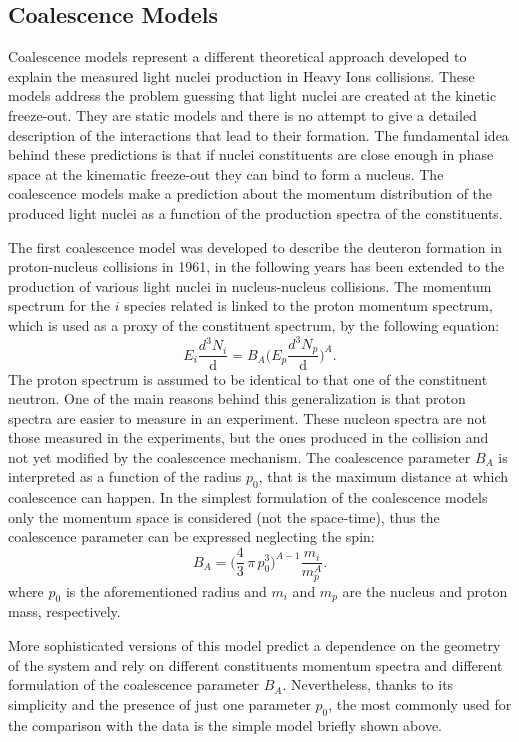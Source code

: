%
\subsection{Coalescence Models} \label{sec:1.4.2}

Coalescence models \cite{deuprod} represent a different theoretical approach developed to explain 
the measured light nuclei production in Heavy Ions collisions. 
These models address the problem guessing that light nuclei are created at the kinetic freeze-out. 
They are static models and there is no attempt to give a detailed description of the 
interactions that lead to their formation.
The fundamental idea behind these predictions is that if nuclei constituents are close enough in 
phase space at the kinematic freeze-out they can bind to form a nucleus. 
The coalescence models make a prediction about the momentum distribution of the produced light 
nuclei as a function of the production spectra of the constituents.

The first coalescence model was developed to describe the deuteron formation in
proton-nucleus collisions in 1961, in the following years has been extended to 
the production of various light nuclei in nucleus-nucleus collisions.
The momentum spectrum for the $i$ species related is linked to the proton momentum spectrum,
which is used as a proxy of the constituent spectrum, by the following equation:
\begin{equation}
    E_{i} \frac{d^{3}N_{i}}{\mathop{dp_{i}^{3}}} = B_{A} \Big( E_{p} \frac{d^{3}N_{p}}{\mathop{dp_{p}^{3}}} \Big)^{A}.
\end{equation}
The proton spectrum is assumed to be identical to that one of the constituent neutron.
One of the main reasons behind this generalization is that proton spectra are easier to measure
in an experiment.
These nucleon spectra are not those measured in the experiments, but the ones produced in the 
collision and not yet modified by the coalescence mechanism.
The coalescence parameter $B_{A}$ is interpreted as a function of the radius $p_{0}$, that 
is the maximum distance at which coalescence can happen.
In the simplest formulation of the coalescence models only the momentum space is considered
(not the space-time), thus the coalescence parameter can be expressed neglecting the spin:
\begin{equation} 
    B_{A} = \Big( \frac{4}{3}\, \pi \,p_{0}^3 \Big)^{A-1} \frac{m_{i}}{m_{p}^{A}}.
\end{equation}
where $p_{0}$ is the aforementioned radius and $m_{i}$ and $m_{p}$ are the nucleus and proton
mass, respectively.

More sophisticated versions of this model predict a dependence on the geometry of the system
and rely on different constituents momentum spectra and different formulation of 
the coalescence parameter $B_{A}$. Nevertheless, thanks to its simplicity and the presence
of just one parameter $p_{0}$, the most commonly used for the comparison with the data is
the simple model briefly shown above.